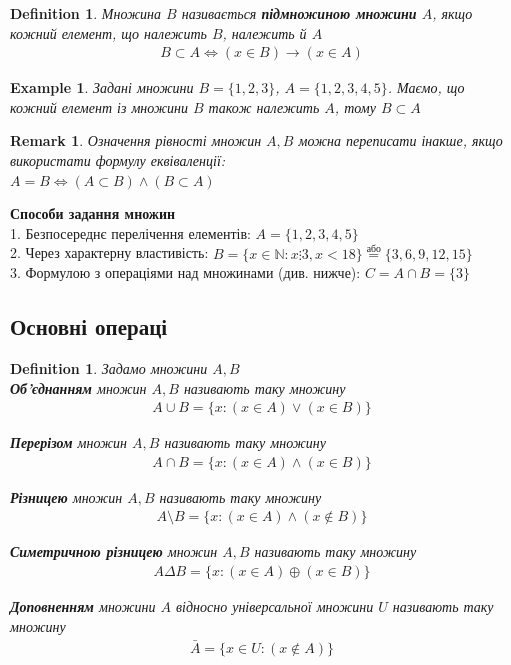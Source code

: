 \documentclass[a4paper, 14pt]{extarticle}
\theoremstyle{theoremdd}
\theoremstyle{theoremdd}
\newtheorem{definition}[theorem]{Definition}
\theoremstyle{theoremdd}
\theoremstyle{theoremdd}
\newtheorem{example}[theorem]{Example}
\theoremstyle{theoremdd}
\theoremstyle{theoremdd}
\newtheorem{remark}[theorem]{Remark}
\theoremstyle{theoremdd}
\theoremstyle{theoremdd}
\begin{document}
\begin{definition}
Множина $B$ називається \textbf{підмножиною множини} $A$, якщо кожний елемент, що належить $B$, належить й $A$
\begin{align*}
B \subset A \iff (x \in B) \rightarrow (x \in A)
\end{align*}
\end{definition}

\begin{example}
Задані множини $B = \{1,2,3\}$, $A = \{1,2,3,4,5\}$. Маємо, що кожний елемент із множини $B$ також належить $A$, тому $B \subset A$
\end{example}

\begin{remark}
Означення рівності множин $A,B$ можна переписати інакше, якщо використати формулу еквіваленції: \\
$A=B \iff (A \subset B) \wedge (B \subset A)$
\end{remark}

\textbf{Способи задання множин}\\
1. Безпосереднє перелічення елементів: $A = \{1,2,3,4,5\}$\\
2. Через характерну властивість: $B = \{ x \in \mathbb{N}: x \vdots 3, x < 18 \} \overset{\text{або}}{=} \{3,6,9,12,15\}$\\
3. Формулою з операціями над множинами (див. нижче): $C = A \cap B = \{3\}$

\subsection{Основні операці}
\begin{definition}
Задамо множини $A,B$\\
\textbf{Об'єднанням} множин $A,B$ називають таку множину
\begin{align*}
A \cup B = \{x: (x \in  A) \vee (x \in B) \}
\end{align*}

\textbf{Перерізом} множин $A,B$ називають таку множину
\begin{align*}
A \cap B = \{x: (x \in  A) \wedge (x \in B) \}
\end{align*}

\textbf{Різницею} множин $A,B$ називають таку множину
\begin{align*}
A \setminus B = \{x: (x \in A) \wedge (x \not\in B)\}
\end{align*}

\textbf{Симетричною різницею} множин $A,B$ називають таку множину
\begin{align*}
A \Delta B = \{x: (x \in A) \oplus (x \in B)\}
\end{align*}

\textbf{Доповненням} множини $A$ відносно універсальної множини $U$ називають таку множину
\begin{align*}
\bar{A} = \{x \in U: (x \not\in A)\}
\end{align*}
\end{definition}
\end{document}

